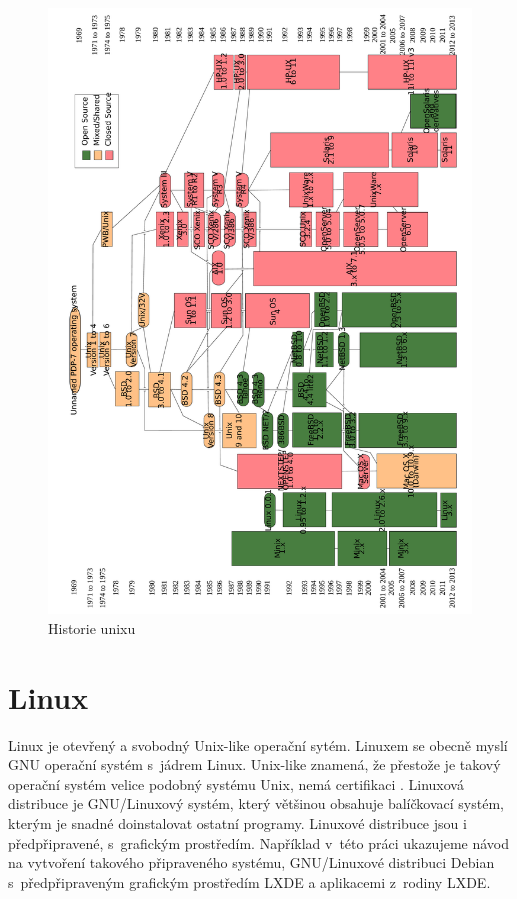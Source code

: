 \documentclass[thesis=M,czech]{FITthesis}[2012/06/26]
\begin{document}
\begin{figure}
	\includegraphics[width=1.0\textwidth]{./images/Unix_history-simple_rot_big}
	\caption{Historie unixu \cite{unixhistorysvg}}
	\label{fig:unixhistory}
\end{figure}



\section{Linux}
Linux \cite{linux} je otevřený a svobodný Unix-like operační sytém. Linuxem se obecně myslí GNU operační systém s~jádrem Linux. Unix-like znamená, že přestože je takový operační systém velice podobný systému Unix, nemá certifikaci . Linuxová distribuce je GNU/Linuxový systém, který většinou obsahuje balíčkovací systém, kterým je snadné doinstalovat ostatní programy. Linuxové distribuce jsou i předpřipravené, s~grafickým prostředím. Například v~této práci ukazujeme návod na vytvoření takového připraveného systému, GNU/Linuxové distribuci Debian s~předpřipraveným grafickým prostředím LXDE a aplikacemi z~rodiny LXDE.
\end{document}
